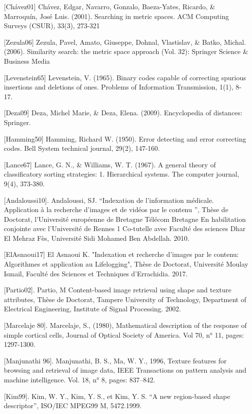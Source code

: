 [Chávez01] Chávez, Edgar, Navarro, Gonzalo, Baeza-Yates, Ricardo, \& Marroquín, José Luis. (2001). Searching in
metric spaces. ACM Computing Surveys (CSUR), 33(3), 273-321

[Zezula06]  Zezula, Pavel, Amato, Giuseppe, Dohnal, Vlastislav, \& Batko, Michal. (2006). Similarity search: the
metric space approach (Vol. 32): Springer Science \& Business Media

[Levenstein65] Levenstein, V. (1965). Binary codes capable of correcting spurious insertions and deletions of ones.
Problems of Information Transmission, 1(1), 8-17.

[Deza09] Deza, Michel Marie, \& Deza, Elena. (2009). Encyclopedia of distances: Springer.

[Hamming50] Hamming, Richard W. (1950). Error detecting and error correcting codes. Bell System technical
journal, 29(2), 147-160.

[Lance67] Lance, G. N., \& Williams, W. T. (1967). A general theory of classificatory sorting
strategies: 1. Hierarchical systems. The computer journal, 9(4), 373-380.

[Andaloussi10]. Andaloussi, SJ. “Indexation de l’information médicale. Application à la recherche
d’images et de vidéos par le contenu ”, Thèse de Doctorat, l’Université européenne de Bretagne Télécom Bretagne En habilitation conjointe avec l’Université de Rennes 1 Co-tutelle
avec Faculté des sciences Dhar El Mehraz Fès, Université Sidi Mohamed Ben Abdellah.
2010.

[ElAsnaoui17] El Asnaoui K. "Indexation et recherche d’images par le contenu: Algorithmes et application au Lifelogging", Thèse de Doctorat,
Université Moulay Ismail, Faculté des Sciences et Techniques d’Errachidia. 2017.

[Partio02]. Partio, M Content-based image retrieval using shape and texture attributes, Thèse de
Doctorat, Tampere University of Technology, Department of Electrical Engineering, Institute
of Signal Processing. 2002.

[Marcelaje 80]. Marcelaje, S., (1980), Mathematical description of the response of simple cortical
cells, Journal of Optical Society of America. Vol 70, n° 11, pages: 1297-1300.

[Manjunathi 96]. Manjunathi, B. S., Ma, W. Y., 1996, Texture features for browsing and retrieval of
image data, IEEE Transactions on pattern analysis and machine intelligence. Vol. 18, n° 8,
pages: 837–842.

[Kim99]. Kim, W. Y., Kim, Y. S., et Kim, Y. S. “A new region-based shape descriptor”,
ISO/IEC MPEG99 M, 5472.1999.

